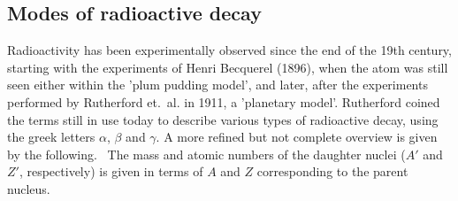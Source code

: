 \subsection{Modes of radioactive decay}
Radioactivity has been experimentally observed since the end of the 19th century, 
starting with the experiments of Henri Becquerel (1896), when the atom was still seen 
either within the 'plum pudding model', and later, after the experiments performed by 
Rutherford et.~al. in 1911, a 'planetary model'. Rutherford coined the terms still in 
use today to describe various types of radioactive decay, using the greek letters 
$\alpha$, $\beta$ and $\gamma$. A more refined but not complete overview is 
given by the following.~ \cite{martin2006nuclear}
The mass and atomic numbers of the daughter nuclei ($A'$ and $Z'$, respectively) 
is given in terms of $A$ and $Z$ corresponding to the parent nucleus. 
